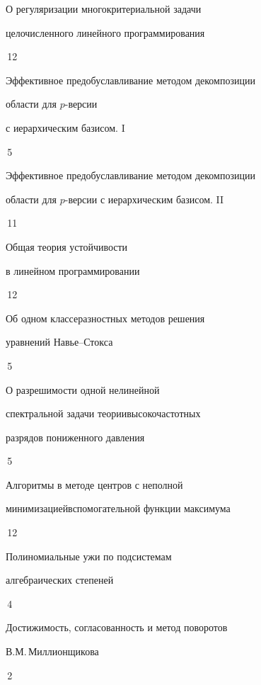 {О регуляризации многокритериальной задачи\newline


целочисленного линейного программирования}{\No\,12}




{Эффективное предобуславливание методом декомпозиции\newline


области для $p$-версии


с иерархическим базисом. I}{\No\,5}




{Эффективное предобуславливание методом декомпозиции \newline


области для $p$-версии с иерархическим базисом. II}{\No\,11}




{Общая теория устойчивости 


в линейном программировании}{\No\,12}




{Об одном классе\newline разностных методов решения


уравнений Навье--Стокса}{\No\,5}




{О разрешимости одной нелинейной


спектральной задачи теории\newline высокочастотных


разрядов пониженного давления}{\No\,5}




{Алгоритмы в методе центров с неполной


минимизацией\newline вспомогательной функции максимума}{\No\,12}




{Полиномиальные ужи по подсистемам


алгебраических степеней}{\No\,4}




{Достижимость, согласованность и метод поворотов\newline


В.М.\,Миллионщикова}{\No\,2}


